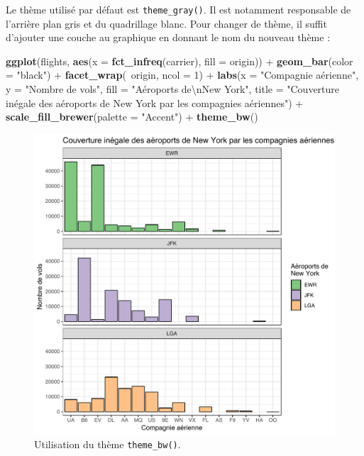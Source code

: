 \documentclass[a4paperpaper,]{article}
\newenvironment{Shaded}{\begin{snugshade}}{\end{snugshade}}
\newcommand{\CharTok}[1]{\textcolor[rgb]{0.57,0.30,0.62}{#1}}
\newcommand{\DataTypeTok}[1]{\textcolor[rgb]{0.00,0.34,0.68}{#1}}
\newcommand{\DecValTok}[1]{\textcolor[rgb]{0.69,0.50,0.00}{#1}}
\newcommand{\KeywordTok}[1]{\textcolor[rgb]{0.12,0.11,0.11}{\textbf{#1}}}
\newcommand{\NormalTok}[1]{\textcolor[rgb]{0.12,0.11,0.11}{#1}}
\newcommand{\OperatorTok}[1]{\textcolor[rgb]{0.12,0.11,0.11}{#1}}
\newcommand{\StringTok}[1]{\textcolor[rgb]{0.75,0.01,0.01}{#1}}
\theoremstyle{definition}
\theoremstyle{definition}
\theoremstyle{definition}
\theoremstyle{remark}
\begin{document}
Le thème utilisé par défaut est \texttt{theme\_gray()}. Il est notamment
responsable de l'arrière plan gris et du quadrillage blanc. Pour changer
de thème, il suffit d'ajouter une couche au graphique en donnant le nom
du nouveau thème :

\begin{Shaded}
\begin{Highlighting}[]
\KeywordTok{ggplot}\NormalTok{(flights, }\KeywordTok{aes}\NormalTok{(}\DataTypeTok{x =} \KeywordTok{fct_infreq}\NormalTok{(carrier), }\DataTypeTok{fill =}\NormalTok{ origin)) }\OperatorTok{+}
\StringTok{  }\KeywordTok{geom_bar}\NormalTok{(}\DataTypeTok{color =} \StringTok{"black"}\NormalTok{) }\OperatorTok{+}
\StringTok{  }\KeywordTok{facet_wrap}\NormalTok{(}\OperatorTok{~}\NormalTok{origin, }\DataTypeTok{ncol =} \DecValTok{1}\NormalTok{) }\OperatorTok{+}
\StringTok{  }\KeywordTok{labs}\NormalTok{(}\DataTypeTok{x =} \StringTok{"Compagnie aérienne"}\NormalTok{,}
       \DataTypeTok{y =} \StringTok{"Nombre de vols"}\NormalTok{,}
       \DataTypeTok{fill =} \StringTok{"Aéroports de}\CharTok{\textbackslash{}n}\StringTok{New York"}\NormalTok{,}
       \DataTypeTok{title =} \StringTok{"Couverture inégale des aéroports de New York par les compagnies aériennes"}\NormalTok{) }\OperatorTok{+}
\StringTok{  }\KeywordTok{scale_fill_brewer}\NormalTok{(}\DataTypeTok{palette =} \StringTok{"Accent"}\NormalTok{) }\OperatorTok{+}
\StringTok{  }\KeywordTok{theme_bw}\NormalTok{()}
\end{Highlighting}
\end{Shaded}

\begin{figure}[htpb]

{\centering \includegraphics[width=0.9\linewidth]{figure/themebw-1} 

}

\caption{Utilisation du thème \texttt{theme\_bw()}.}\label{fig:themebw}
\end{figure}
\end{document}
